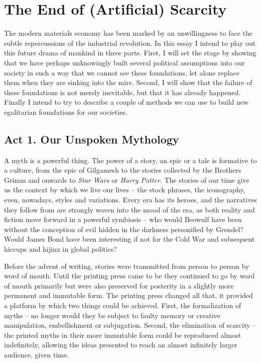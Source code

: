 \begin{savequote}
\end{savequote}
\chapter{The End of (Artif\hbox{}icial) Scarcity}
\label{c:articifial_scarcity}

The modern materials economy has been marked by an unwillingness to face the
subtle repercussions of the industrial revolution. In this essay I intend to
play out this future drama of mankind in three parts. F\hbox{}irst, I will set
the stage by showing that we have perhaps unknowingly built several political
assumptions into our society in such a way that we cannot see these 
foundations, let alone replace them when they are sinking into the mire. 
Second, I will show that the failure of these foundations is not merely
inevitable, but that it has already happened. F\hbox{}inally I intend to try to
describe a couple of methods we can use to build new egalitarian foundations 
for our societies.


\section{Act 1. Our Unspoken Mythology}
\label{s:artificial_scarcity:unspoken_mythology}

A myth is a powerful thing. The power of a story, an epic or a tale is 
formative to a culture, from the epic of Gilgamesh to the stories collected by
the Brothers Grimm and onwards to \textit{Star Wars} or \textit{Harry Potter}.
The stories of our time give us the context by which we live our lives – the
stock phrases, the iconography, even, nowadays, styles and variations. Every 
era has its heroes, and the narratives they follow from are strongly woven into
the mood of the era, as both reality and f\hbox{}iction move forward in a
powerful symbiosis – who would Beowulf have been without the conception of evil
hidden in the darkness personif\hbox{}ied by Grendel? Would James Bond have 
been interesting if not for the Cold War and subsequent hiccups and hijinx in
global politics?

Before the advent of writing, stories were transmitted from person to person by
word of mouth. Until the printing press came to be they continued to go by word
of mouth primarily but were also preserved for posterity in a slightly more
permanent and immutable form. The printing press changed all that, it provided 
a platform by which two things could be achieved. F\hbox{}irst, the
formalization of myths – no longer would they be subject to faulty memory or
creative manipulation, embellishment or subjugation. Second, the elimination of
scarcity – the printed myths in their more immutable form could be reproduced
almost indef\hbox{}initely, allowing the ideas presented to reach an almost
inf\hbox{}initely larger audience, given time.

